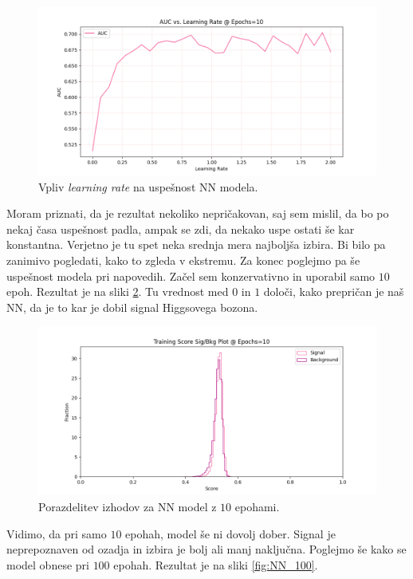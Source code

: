 \documentclass[a4paper]{article}
\begin{document}
\begin{figure}[H]
    \centering
    \includegraphics[width=1\textwidth]{../images/NNlr_sweep.png}
    \caption{Vpliv \textit{learning rate} na uspešnost NN modela.}
    \label{fig:NN_lr}
\end{figure}

Moram priznati, da je rezultat nekoliko nepričakovan, saj sem mislil, da bo po nekaj časa uspešnost padla, ampak
se zdi, da nekako uspe ostati še kar konstantna. Verjetno je tu spet neka srednja mera najboljša izbira. Bi bilo pa zanimivo
pogledati, kako to zgleda v ekstremu. Za konec poglejmo pa še uspešnost modela pri napovedih. Začel sem konzervativno in 
uporabil samo $10$ epoh. Rezultat je na sliki \ref{fig:NN_10}. Tu vrednost med $0$ in $1$ določi, kako prepričan je naš NN, 
da je to kar je dobil signal Higgsovega bozona.

\begin{figure}[H]
    \centering
    \includegraphics[width=1\textwidth]{../images/NNsig_bk_10.png}
    \caption{Porazdelitev izhodov za NN model z $10$ epohami.}
    \label{fig:NN_10}
\end{figure}

Vidimo, da pri samo $10$ epohah, model še ni dovolj dober. Signal je neprepoznaven od ozadja in izbira je bolj ali manj
naključna. Poglejmo še kako se model obnese pri $100$ epohah. Rezultat je na sliki \ref{fig:NN_100}. \\
\end{document}
